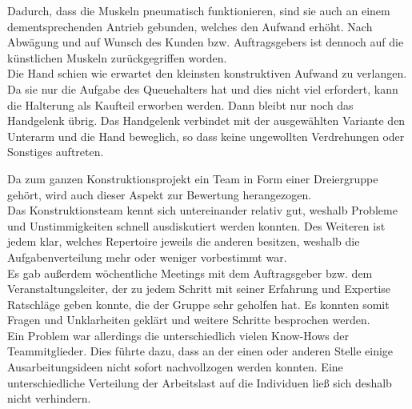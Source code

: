 	Dadurch, dass die Muskeln pneumatisch funktionieren, sind sie auch an einem dementsprechenden Antrieb gebunden, welches den Aufwand erhöht.
	Nach Abwägung und auf Wunsch des Kunden bzw. Auftragsgebers ist dennoch auf die künstlichen Muskeln zurückgegriffen worden.\\
	Die Hand schien wie erwartet den kleinsten konstruktiven Aufwand zu verlangen.
	Da sie nur die Aufgabe des Queuehalters hat und dies nicht viel erfordert, kann die Halterung als Kaufteil erworben werden.
	Dann bleibt nur noch das Handgelenk übrig.
	Das Handgelenk verbindet mit der ausgewählten Variante den Unterarm und die Hand beweglich, so dass keine ungewollten Verdrehungen oder Sonstiges auftreten.\par \medskip
	Da zum ganzen Konstruktionsprojekt ein Team in Form einer Dreiergruppe gehört, wird auch dieser Aspekt zur Bewertung herangezogen.\\
	Das Konstruktionsteam kennt sich untereinander relativ gut, weshalb Probleme und Unstimmigkeiten schnell ausdiskutiert werden konnten.
	Des Weiteren ist jedem klar, welches Repertoire jeweils die anderen besitzen, weshalb die Aufgabenverteilung mehr oder weniger vorbestimmt war.\\
	Es gab außerdem wöchentliche Meetings mit dem Auftragsgeber bzw. dem Veranstaltungsleiter, der zu jedem Schritt mit seiner Erfahrung und Expertise Ratschläge geben konnte, die der Gruppe sehr geholfen hat.
	Es konnten somit Fragen und Unklarheiten geklärt und weitere Schritte besprochen werden.\\
	Ein Problem war allerdings die unterschiedlich vielen Know-Hows der Teammitglieder.
	Dies führte dazu, dass an der einen oder anderen Stelle einige Ausarbeitungsideen nicht sofort nachvollzogen werden konnten.
	Eine unterschiedliche Verteilung der Arbeitslast auf die Individuen ließ sich deshalb nicht verhindern.
